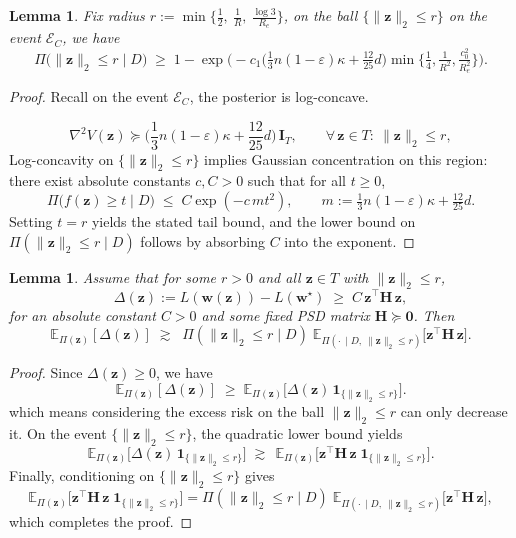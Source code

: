 \documentclass{article}
\theoremstyle{plain}
\newtheorem{lemma}[theorem]{Lemma}
\theoremstyle{definition}
\theoremstyle{remark}
\begin{document}
{\begin{lemma}
\label{lem:mass_inside_r}
Fix radius $r := \min\Big\{\tfrac12,\ \tfrac{1}{R},\ \tfrac{\log 3}{R_e}\Big\}$, on the ball $\{\|\boldsymbol z\|_2\le r\}$ on the event $\mathcal{E}_{C}$,  we have 
\[
\Pi\big(\|\boldsymbol z\|_2\le r\mid D\big)
\;\ge\;
1-
\exp\!\Bigg(
-c_1\Big(\tfrac{1}{3}n(1-\varepsilon)\kappa+\tfrac{12}{25}d\Big)
\min\Big\{\tfrac14,\tfrac{1}{R^2},\tfrac{c_0^2}{R_e^2}\Big\}
\Bigg).
\]
\end{lemma}

\begin{proof}
Recall on the event $\mathcal{E}_{C}$, the posterior is log-concave. 

\[
\nabla^2 V(\mathbf z)\succeq
\Big(\frac{1}{3}n(1-\varepsilon)\kappa+\frac{12}{25}d\Big)\,\mathbf I_T,
\qquad
\forall\,\mathbf z\in T:\ \|\mathbf z\|_2\le r,
\]
Log-concavity on $\{\|\boldsymbol z\|_2\le r\}$ implies Gaussian concentration on this region:
there exist absolute constants $c,C>0$ such that for all $t\ge 0$,
\[
\Pi\big(f(\boldsymbol z)\ge t\mid D\big)\;\le\; C\exp(-c\,m t^2),
\qquad
m:=\tfrac{1}{3}n(1-\varepsilon)\kappa+\tfrac{12}{25}d.
\]
Setting $t=r$ yields the stated tail bound, and the lower bound on
$\Pi(\|\boldsymbol z\|_2\le r\mid D)$ follows by absorbing $C$ into the exponent.
\end{proof}


\begin{lemma}
\label{lem:trunc_reduction}
Assume that for some $r>0$ and all $\mathbf z\in T$ with $\|\mathbf z\|_2\le r$,
$$
\Delta(\mathbf z):=L(\mathbf w(\mathbf z))-L(\mathbf w^\star)
\;\ge\;
C\,\mathbf z^\top \mathbf H\,\mathbf z,
$$
for an absolute constant $C>0$ and some fixed PSD matrix $\mathbf H\succeq \mathbf 0$. Then
$$
\mathbb E_{\Pi(\mathbf z)}[\Delta(\mathbf z)]
\;\gtrsim\;
\;
\Pi(\|\mathbf z\|_2\le r\mid D)\;
\mathbb E_{\Pi(\cdot\,\mid D,\ \|\mathbf z\|_2\le r)}\!\big[\mathbf z^\top \mathbf H\,\mathbf z\big].
$$
\end{lemma}

\begin{proof}
Since $\Delta(\mathbf z)\ge 0$, we have
$$
\mathbb E_{\Pi(\mathbf{z})}[\Delta(\mathbf z)]
\;\ge\;
\mathbb E_{\Pi(\mathbf{z})}\!\big[\Delta(\mathbf z)\,\mathbf 1_{\{\|\mathbf z\|_2\le r\}}\big].
$$
which means considering the excess risk on the ball $\|\mathbf z\|_2\le r$ can only decrease it. 
On the event $\{\|\mathbf z\|_2\le r\}$, the quadratic lower bound yields
$$
\mathbb E_{\Pi(\mathbf{z})}\!\big[\Delta(\mathbf z)\,\mathbf 1_{\{\|\mathbf z\|_2\le r\}}\big]
\;\gtrsim\;
\,
\mathbb E_{\Pi(\mathbf{z})}\!\big[\mathbf z^\top \mathbf H\,\mathbf z\;\mathbf 1_{\{\|\mathbf z\|_2\le r\}}\big].
$$
Finally, conditioning on $\{\|\mathbf z\|_2\le r\}$ gives
$$
\mathbb E_{\Pi(\mathbf{z})}\!\big[\mathbf z^\top \mathbf H\,\mathbf z\;\mathbf 1_{\{\|\mathbf z\|_2\le r\}}\big]
=
\Pi(\|\mathbf z\|_2\le r\mid D)\;
\mathbb E_{\Pi(\cdot\,\mid D,\ \|\mathbf z\|_2\le r)}\!\big[\mathbf z^\top \mathbf H\,\mathbf z\big],
$$
which completes the proof.
\end{proof}

}
\end{document}
